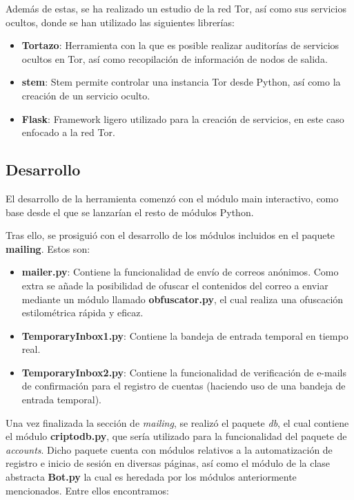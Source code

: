 Además de estas, se ha realizado un estudio de la red Tor, así como sus servicios ocultos, donde se han utilizado las siguientes librerías:
\begin{itemize}
	\item \textbf{Tortazo}: Herramienta con la que es posible realizar auditorías de servicios ocultos en Tor, así como recopilación de información de nodos de salida.
	\item \textbf{stem}: Stem permite controlar una instancia Tor desde Python, así como la creación de un servicio oculto.
	\item \textbf{Flask}: Framework ligero utilizado para la creación de servicios, en este caso enfocado a la red Tor.
\end{itemize}
\subsection{Desarrollo}

El desarrollo de la herramienta comenzó con el módulo main interactivo, como base desde el que se lanzarían el resto de módulos Python.

Tras ello, se prosiguió con el desarrollo de los módulos incluidos en el paquete \textbf{mailing}. Estos son:
\begin{itemize}
	\item \textbf{mailer.py}: Contiene la funcionalidad de envío de correos anónimos. Como extra se añade la posibilidad de ofuscar el contenidos del correo a enviar mediante un módulo llamado \textbf{obfuscator.py}, el cual realiza una ofuscación estilométrica rápida y eficaz.
	\item \textbf{TemporaryInbox1.py}: Contiene la bandeja de entrada temporal en tiempo real.
	\item \textbf{TemporaryInbox2.py}: Contiene la funcionalidad de verificación de e-mails de confirmación para el registro de cuentas (haciendo uso de una bandeja de entrada temporal).
\end{itemize}

Una vez finalizada la sección de \textit{mailing}, se realizó el paquete \textit{db}, el cual contiene el módulo \textbf{criptodb.py}, que sería utilizado para la funcionalidad del paquete de \textit{accounts}.
Dicho paquete cuenta con módulos relativos a la automatización de registro e inicio de sesión en diversas páginas, así como el módulo de la clase abstracta \textbf{Bot.py} la cual es heredada por los módulos anteriormente mencionados. Entre ellos encontramos:

